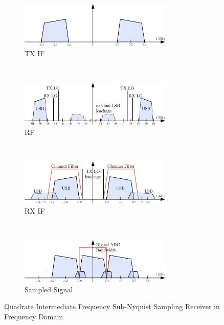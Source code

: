 \begin{figure}[ht]
  \centering
  \begin{subfigure}{\textwidth}
    \centering
    \includegraphics[width=0.8\textwidth]{figures/rx_2_freq_tx_if}
    \caption{\gls{TX} \gls{IF}}
    \label{fig:rx_2_frq_tx_if}
  \end{subfigure}
  \vspace{4ex} \\
  \begin{subfigure}{\textwidth}
    \centering
    \includegraphics[width=0.8\textwidth]{figures/rx_2_freq_rf}
    \caption{\gls{RF}}
    \label{fig:rx_2_freq_rf}
  \end{subfigure}
  \vspace{4ex} \\
  \begin{subfigure}{\textwidth}
    \centering
    \includegraphics[width=0.8\textwidth]{figures/rx_2_freq_rx_if}
    \caption{\gls{RX} \gls{IF}}
    \label{fig:rx_2_freq_rx_if1}
  \end{subfigure}
  \vspace{4ex} \\
  \begin{subfigure}{\textwidth}
    \centering
    \includegraphics[width=0.8\textwidth]{figures/rx_2_freq_rx_adc}
    \caption{Sampled Signal}
    \label{fig:rx_2_freq_rx_if2}
  \end{subfigure}
  \caption{Quadrate Intermediate Frequency Sub-Nyquist Sampling Receiver
    in Frequency Domain}
  \label{fig:rx_2_freq}
\end{figure}
